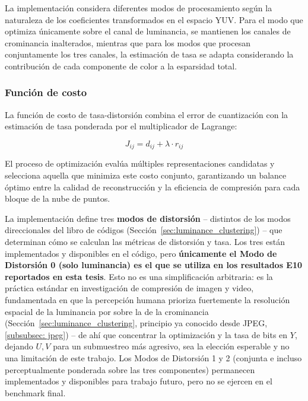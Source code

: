        La implementación considera diferentes modos de procesamiento según la naturaleza de los coeficientes transformados en el espacio YUV. Para el modo que optimiza únicamente sobre el canal de luminancia, se mantienen los canales de crominancia inalterados, mientras que para los modos que procesan conjuntamente los tres canales, la estimación de tasa se adapta considerando la contribución de cada componente de color a la esparsidad total.\\
    
    \subsubsection{Función de costo}
       
       La función de costo de tasa-distorsión combina el error de cuantización con la estimación de tasa ponderada por el multiplicador de Lagrange:
    
       \begin{equation}
           J_{ij} = d_{ij} + \lambda \cdot r_{ij} 
       \end{equation}
    
       El proceso de optimización evalúa múltiples representaciones candidatas y selecciona aquella que minimiza este costo conjunto, garantizando un balance óptimo entre la calidad de reconstrucción y la eficiencia de compresión para cada bloque de la nube de puntos.

        La implementación define tres \textbf{modos de distorsión} -- distintos de los modos direccionales del libro de códigos (Sección~\ref{sec:luminance_clustering}) -- que determinan cómo se calculan las métricas de distorsión y tasa. Los tres están implementados y disponibles en el código, pero \textbf{únicamente el Modo de Distorsión 0 (solo luminancia) es el que se utiliza en los resultados E10 reportados en esta tesis}. Esto no es una simplificación arbitraria: es la práctica estándar en investigación de compresión de imagen y video, fundamentada en que la percepción humana prioriza fuertemente la resolución espacial de la luminancia por sobre la de la crominancia (Sección~\ref{sec:luminance_clustering}, principio ya conocido desde JPEG, \ref{subsubsec: jpeg}) -- de ahí que concentrar la optimización y la tasa de bits en $Y$, dejando $U,V$ para un submuestreo más agresivo, sea la elección esperable y no una limitación de este trabajo. Los Modos de Distorsión 1 y 2 (conjunta e incluso perceptualmente ponderada sobre las tres componentes) permanecen implementados y disponibles para trabajo futuro, pero no se ejercen en el benchmark final.

